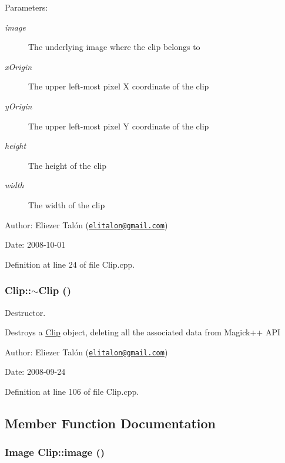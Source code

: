 \begin{Desc}
\item[Parameters:]
\begin{description}
\item[{\em image}]The underlying image where the clip belongs to \item[{\em xOrigin}]The upper left-most pixel X coordinate of the clip \item[{\em yOrigin}]The upper left-most pixel Y coordinate of the clip \item[{\em height}]The height of the clip \item[{\em width}]The width of the clip\end{description}
\end{Desc}
\begin{Desc}
\item[Author:]Eliezer Talón (\href{mailto:elitalon@gmail.com}{\tt elitalon@gmail.com}) \end{Desc}
\begin{Desc}
\item[Date:]2008-10-01 \end{Desc}


Definition at line 24 of file Clip.cpp.\hypertarget{class_clip_88647ed65e3482b5e0533ec98667b0fa}{
\subsubsection[$\sim$Clip]{\setlength{\rightskip}{0pt plus 5cm}Clip::$\sim$Clip ()}}
\label{class_clip_88647ed65e3482b5e0533ec98667b0fa}


Destructor. 

Destroys a \hyperlink{class_clip}{Clip} object, deleting all the associated data from Magick++ API

\begin{Desc}
\item[Author:]Eliezer Talón (\href{mailto:elitalon@gmail.com}{\tt elitalon@gmail.com}) \end{Desc}
\begin{Desc}
\item[Date:]2008-09-24 \end{Desc}


Definition at line 106 of file Clip.cpp.

\subsection{Member Function Documentation}
\hypertarget{class_clip_f4500103f1babcf2b9283eaffc6af96a}{
\subsubsection[image]{\setlength{\rightskip}{0pt plus 5cm}Image Clip::image ()}}
\label{class_clip_f4500103f1babcf2b9283eaffc6af96a}


